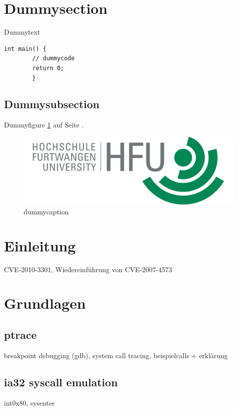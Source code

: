 \documentclass[11pt,a4paper]{article}
\begin{document}
\lstset{language=C}


\clearpage
\setcounter{page}{1}
\tableofcontents

\section{Dummysection}
\setcounter{page}{1}
Dummytext \cite{DIE0}
\begin{lstlisting}[frame=single]
int main() {
        // dummycode
        return 0;
        }
\end{lstlisting}
\subsection{Dummysubsection}
Dummyfigure \ref{hfu} auf Seite \pageref{hfu}.

\begin{figure}[h!]
  \caption{dummycaption}
  \label{hfu}
  \centering
    \includegraphics[scale=1]{hfu.png}
\end{figure}


\section{Einleitung}
CVE-2010-3301, Wiedereinführung von CVE-2007-4573 \cite{CVE0}
\section{Grundlagen}
\subsection{ptrace}
breakpoint debugging (gdb), system call tracing, beispielcalls + erklärung \cite{DIE0}
\subsection{ia32 syscall emulation}
int0x80, sysenter \cite{WIK0}\cite{JES0}
\end{document}
